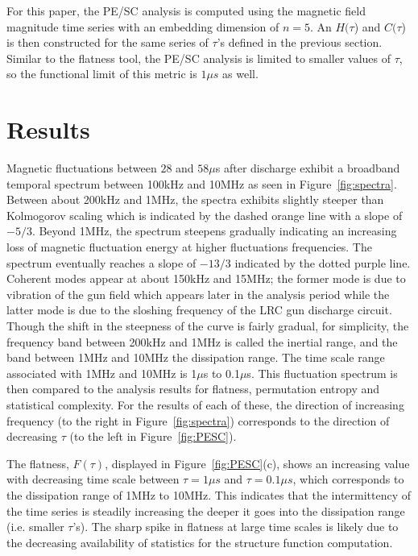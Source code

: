 \documentclass[aip,pop,amsmath,amssymb,preprint,superscriptaddress]{revtex4-1} %
\begin{document}
For this paper, the PE/SC analysis is computed using the magnetic field magnitude time series with an embedding dimension of $n=5$. An $H(\tau$) and $C(\tau$) is then constructed for the same series of $\tau$'s defined in the previous section. Similar to the flatness tool, the PE/SC analysis is limited to smaller values of $\tau$, so the functional limit of this metric is $1\mu s$ as well.

\section{Results}

Magnetic fluctuations between $28$ and $58\mu$s after discharge exhibit a broadband temporal spectrum between 100kHz and 10MHz as seen in Figure~\ref{fig:spectra}. Between about 200kHz and 1MHz, the spectra exhibits slightly steeper than Kolmogorov scaling which is indicated by the dashed orange line with a slope of $-5/3$. Beyond 1MHz, the spectrum steepens gradually indicating an increasing loss of magnetic fluctuation energy at higher fluctuations frequencies. The spectrum eventually reaches a slope of $-13/3$ indicated by the dotted purple line. Coherent modes appear at about 150kHz and 15MHz; the former mode is due to vibration of the gun field which appears later in the analysis period while the latter mode is due to the sloshing frequency of the LRC gun discharge circuit. Though the shift in the steepness of the curve is fairly gradual, for simplicity,  the frequency band between 200kHz and 1MHz is called the inertial range, and the band between 1MHz and 10MHz the dissipation range. The time scale range associated with 1MHz and 10MHz is 1$\mu$s to 0.1$\mu$s. This fluctuation spectrum is then compared to the analysis results for flatness, permutation entropy and statistical complexity. For the results of each of these, the direction of increasing frequency (to the right in Figure~\ref{fig:spectra}) corresponds to the direction of decreasing $\tau$ (to the left in Figure~\ref{fig:PESC}).

The flatness, $F(\tau)$, displayed in Figure~\ref{fig:PESC}(c), shows an increasing value with decreasing time scale between $\tau = 1\mu s$ and $\tau = 0.1\mu s$, which corresponds to the dissipation range of 1MHz to 10MHz. This indicates that the intermittency of the time series is steadily increasing the deeper it goes into the dissipation range (i.e. smaller $\tau$'s). The sharp spike in flatness at large time scales is likely due to the decreasing availability of statistics for the structure function computation.
\end{document}
